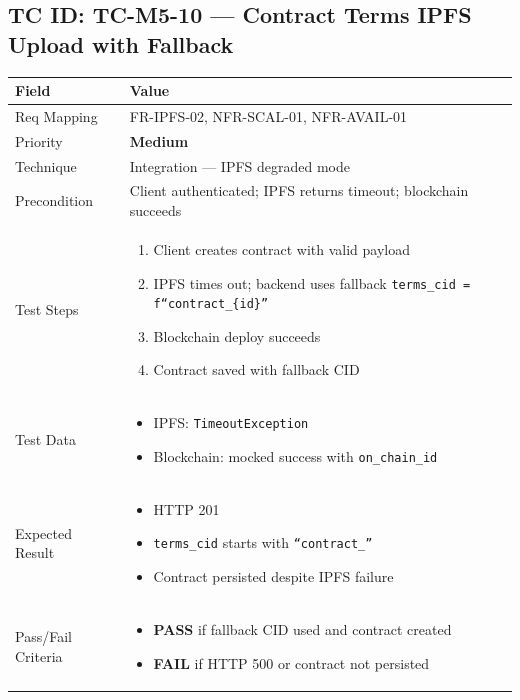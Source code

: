 \documentclass[12pt,a4paper]{article}
\newcommand{\sevmed}{\textcolor{severitymed}{\textbf{Medium}}}
\newcommand{\passresult}{\textcolor{passgreen}{\textbf{PASS}}}
\newcommand{\failresult}{\textcolor{failred}{\textbf{FAIL}}}
\begin{document}
\vspace{0.8cm}

\subsection{TC ID: TC-M5-10 --- Contract Terms IPFS Upload with Fallback}

\begin{tabular}{|p{}|p{}|}
\hline
\rowcolor{lightblue} \textbf{Field} & \textbf{Value} \\
\hline
Req Mapping & FR-IPFS-02, NFR-SCAL-01, NFR-AVAIL-01 \\
\hline
Priority & \sevmed \\
\hline
Technique & Integration --- IPFS degraded mode \\
\hline
Precondition & Client authenticated; IPFS returns timeout; blockchain succeeds \\
\hline
Test Steps &
\begin{enumerate}[nosep, leftmargin=*]
  \item Client creates contract with valid payload
  \item IPFS times out; backend uses fallback \texttt{terms\_cid = f``contract\_\{id\}''}
  \item Blockchain deploy succeeds
  \item Contract saved with fallback CID
\end{enumerate} \\
\hline
Test Data &
\begin{itemize}[nosep, leftmargin=*]
  \item IPFS: \texttt{TimeoutException}
  \item Blockchain: mocked success with \texttt{on\_chain\_id}
\end{itemize} \\
\hline
Expected Result &
\begin{itemize}[nosep, leftmargin=*]
  \item HTTP 201
  \item \texttt{terms\_cid} starts with \texttt{``contract\_''}
  \item Contract persisted despite IPFS failure
\end{itemize} \\
\hline
Pass/Fail Criteria &
\begin{itemize}[nosep, leftmargin=*]
  \item \passresult{} if fallback CID used and contract created
  \item \failresult{} if HTTP 500 or contract not persisted
\end{itemize} \\
\hline
\end{tabular}
\end{document}
